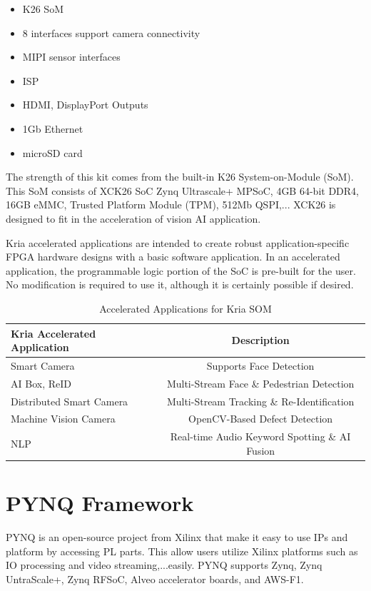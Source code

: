 \documentclass[a4paper, 12pt]{report}
\begin{document}
\begin{itemize}
\item K26 SoM
\item 8 interfaces support camera connectivity
\item MIPI sensor interfaces
\item ISP
\item HDMI, DisplayPort Outputs
\item 1Gb Ethernet
\item microSD card
\end{itemize}

The strength of this kit comes from the built-in K26 System-on-Module (SoM). This SoM consists of XCK26 SoC Zynq Ultrascale+ MPSoC, 4GB 64-bit DDR4, 16GB eMMC, Trusted Platform Module (TPM), 512Mb QSPI,... XCK26 is designed to fit in the acceleration of vision AI application.

Kria accelerated applications are intended to create robust application-specific FPGA hardware designs with a basic software application. In an accelerated application, the programmable logic portion of the SoC is pre-built for the user. No modification is required to use it, although it is certainly possible if desired.
\begin{table}[H]
    \centering
    \begin{tabular}{|l|c|}
        \hline
            \textbf{Kria Accelerated Application} & \textbf{Description}  \\
        \hline
        \hline
            Smart Camera & Supports Face Detection  \\
        \hline
            AI Box, ReID & Multi-Stream Face \& Pedestrian Detection \\
        \hline
            Distributed Smart Camera &  Multi-Stream Tracking \& Re-Identification\\
        \hline
            Machine Vision Camera & OpenCV-Based Defect Detection \\
        \hline
            NLP & Real-time Audio Keyword Spotting \& AI Fusion \\
        \hline
    \end{tabular}
    \caption{Accelerated Applications for Kria SOM}
\end{table}
\section{PYNQ Framework}

PYNQ is an open-source project from Xilinx that make it easy to use IPs and platform by accessing PL parts. This allow users utilize Xilinx platforms such as IO processing and video streaming,...easily. PYNQ supports Zynq, Zynq UntraScale+, Zynq RFSoC, Alveo accelerator boards, and AWS-F1.
\end{document}
